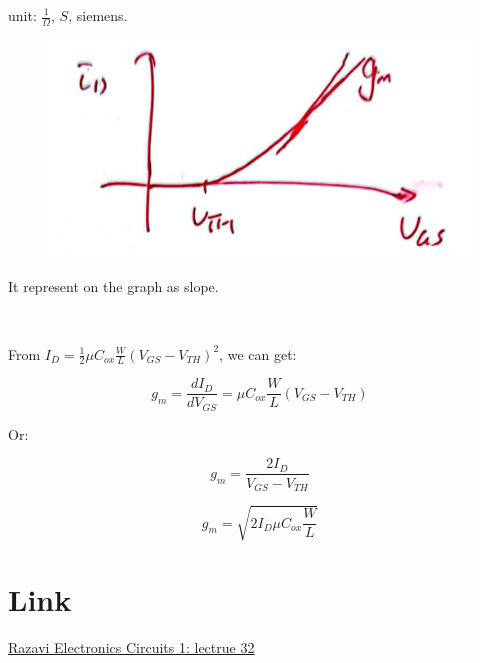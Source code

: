 \documentclass[fontset=windows]{article}
\begin{document}
unit: $\frac{1}{\Omega}$, $S$, siemens. 

\begin{figure}[htbp]
    \centering
    \includegraphics[scale=0.45]{10.jpg}
    \captionsetup{labelformat=empty}
    \caption{}
    \label{10}
\end{figure}

It represent on the graph as slope. 

\

From $I_D=\frac{1}{2} \mu C_{ox}\frac{W}{L}(V_{GS}-V_{TH})^2$, we can get: 

$$g_m=\frac{dI_D}{dV_{GS}}=\mu C_{ox}\frac{W}{L}(V_{GS}-V_{TH})$$

Or: 

$$g_m=\frac{2I_D}{V_{GS}-V_{TH}}$$

$$g_m=\sqrt{2I_D\mu C_{ox}\frac{W}{L}}$$

\section*{Link}

\href{https://www.bilibili.com/video/BV1FD4y1R7Ah?p=32&vd_source=1d0c07486a3bd3b0adb8ac548bf6453e}{Razavi Electronics Circuits 1: lectrue 32}
\end{document}
